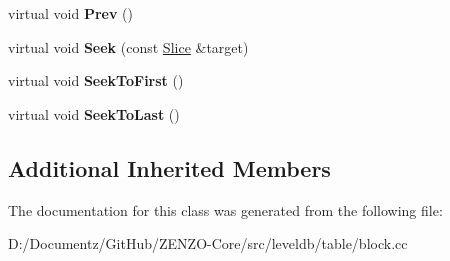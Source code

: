 \begin{DoxyCompactItemize}
virtual void {\bfseries Prev} ()
\item 
\mbox{\label{classleveldb_1_1_block_1_1_iter_a3dcefc0609937b33c046ac7fafb52ad7}} 
virtual void {\bfseries Seek} (const \mbox{\hyperlink{classleveldb_1_1_slice}{Slice}} \&target)
\item 
\mbox{\label{classleveldb_1_1_block_1_1_iter_aecc19bb6d8a219e7fb8e695fb5b57bd3}} 
virtual void {\bfseries Seek\+To\+First} ()
\item 
\mbox{\label{classleveldb_1_1_block_1_1_iter_a3007d98d17a03138c629fc2b2eb56204}} 
virtual void {\bfseries Seek\+To\+Last} ()
\end{DoxyCompactItemize}
\subsection*{Additional Inherited Members}


The documentation for this class was generated from the following file\+:\begin{DoxyCompactItemize}
\item 
D\+:/\+Documentz/\+Git\+Hub/\+Z\+E\+N\+Z\+O-\/\+Core/src/leveldb/table/block.\+cc\end{DoxyCompactItemize}
